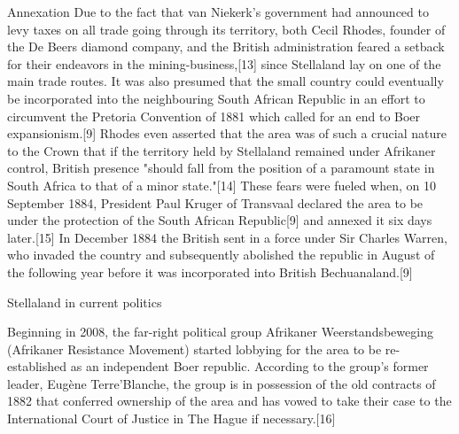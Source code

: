 Annexation
Due to the fact that van Niekerk's government had announced to levy taxes on all trade going through its territory, both Cecil Rhodes, founder of the De Beers diamond company, and the British administration feared a setback for their endeavors in the mining-business,[13] since Stellaland lay on one of the main trade routes. It was also presumed that the small country could eventually be incorporated into the neighbouring South African Republic in an effort to circumvent the Pretoria Convention of 1881 which called for an end to Boer expansionism.[9]
Rhodes even asserted that the area was of such a crucial nature to the Crown that if the territory held by Stellaland remained under Afrikaner control, British presence "should fall from the position of a paramount state in South Africa to that of a minor state."[14] These fears were fueled when, on 10 September 1884, President Paul Kruger of Transvaal declared the area to be under the protection of the South African Republic[9] and annexed it six days later.[15] In December 1884 the British sent in a force under Sir Charles Warren, who invaded the country and subsequently abolished the republic in August of the following year before it was incorporated into British Bechuanaland.[9]

Stellaland in current politics

Beginning in 2008, the far-right political group Afrikaner Weerstandsbeweging (Afrikaner Resistance Movement) started lobbying for the area to be re-established as an independent Boer republic. According to the group's former leader, Eugène Terre'Blanche, the group is in possession of the old contracts of 1882 that conferred ownership of the area and has vowed to take their case to the International Court of Justice in The Hague if necessary.[16]